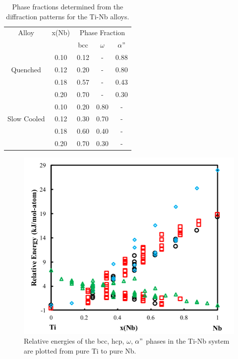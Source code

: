 \newpage
\begin{table}[H]
	\caption{Phase fractions determined from the diffraction patterns for the Ti-Nb alloys.}
	\centering
	\begin{tabular}{ c c c c c }
		\hline
		Alloy & x(Nb) & \multicolumn{3}{c}{Phase Fraction} \\
		&  & bcc & $\omega$ & $\alpha"$ \\
		\hline
		& 0.10 & 0.12 & - & 0.88 \\
		Quenched & 0.12 & 0.20 & - & 0.80 \\
		& 0.18 & 0.57 & - & 0.43 \\
		& 0.20 & 0.70 & - & 0.30 \\
		\hline
		& 0.10 & 0.20 & 0.80 & - \\
		Slow Cooled & 0.12 & 0.30 & 0.70 & - \\
		& 0.18 & 0.60 & 0.40 & - \\
		& 0.20 & 0.70 & 0.30 & - \\
		\hline
	\end{tabular}
	\label{Ch7-table:phasefrac}
\end{table}
\clearpage

\pagebreak
\begin{figure}[H]
	\centering
	\includegraphics[width=\textwidth]{Chapter-7/Figures/tinb0k.png}
	\caption{Relative energies of the bcc, hcp, $\omega$, $\alpha"$ phases in the Ti-Nb system are plotted from pure Ti to pure Nb.}
	\label{Ch7-figure:tinb0K}
\end{figure}

